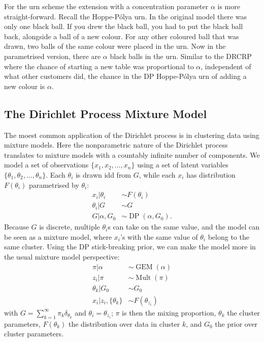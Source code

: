 For the urn scheme the extension with a concentration parameter $\alpha$ is more straight-forward. Recall the Hoppe-P\'olya urn. In the original model there was only one black ball. If you drew the black ball, you had to put the black ball back, alongside a ball of a new colour. For any other coloured ball that was drawn, two balls of the same colour were placed in the urn. Now in the parametrised version, there are $\alpha$ black balls in the urn. Similar to the DRCRP where the chance of starting a new table was proportional to $\alpha$, independent of what other customers did, the chance in the DP Hoppe-P\'olya urn of adding a new colour is $\alpha$.

\subsection{The Dirichlet Process Mixture Model}
The moest common application of the Dirichlet process is in clustering data using mixture models\cite{Antoniak1974Mixtures,Escobar1995Bayesian}. Here the nonparametric nature of the Dirichlet process translates to mixture models with a countably infinite number of components. We model a set of observations $\{x_1, x_2, \ldots, x_n\}$ using a set of latent variables $\{\theta_1,\theta_2,\ldots,\theta_n\}$. Each $\theta_i$ is drawn idd from $G$, while each $x_i$ has distribution $F(\theta_i)$ parametrised by $\theta_i$:
\begin{align}
	x_i|\theta_i&\sim F(\theta_i) \\
    \theta_i|G&\sim G \\
    G|\alpha,G_0&\sim\operatorname{DP}(\alpha,G_0).
\end{align}
Because $G$ is discrete, multiple $\theta_i$s can take on the same value, and the model can be seen as a mixture model, where $x_i$'s with the same value of $\theta_i$ belong to the same cluster. Using the DP stick-breaking prior, we can make the model more in the usual mixture model perspective:
\begin{align}
	\pi|\alpha&\sim\operatorname{GEM}(\alpha) \\
    z_i|\pi&\sim\operatorname{Mult}(\pi) \\
    \theta_k|G_0&\sim G_0 \\
    x_i|z_i, \{\theta_k\}&\sim F(\theta_{z_i})
\end{align}
with $G = \sum_{k=1}^\infty \pi_k\delta_{\theta_k}$ and $\theta_i = \theta_{z_i}$; $\pi$ is then the mixing proportion, $\theta_k$ the cluster parameters, $F(\theta_k)$ the distribution over data in cluster $k$, and $G_0$ the prior over cluster parameters.

